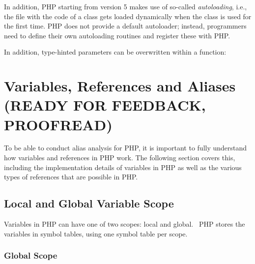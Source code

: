 In addition, PHP starting from version 5 makes use of so-called \emph{autoloading}, i.e., the file with the code of a class gets loaded dynamically when the class is used for the first time. PHP does not provide a default autoloader; instead, programmers need to define their own autoloading routines and register these with PHP.~\cite{php-manual-autoloading}


In addition, type-hinted parameters can be overwritten within a function:




\section{Variables, References and Aliases (READY FOR FEEDBACK, PROOFREAD)}

To be able to conduct alias analysis for PHP, it is important to fully understand how variables and references in PHP work. The following section covers this, including the implementation details of variables in PHP as well as the various types of references that are possible in PHP.


\subsection{Local and Global Variable Scope}
\label{sec:variable-scope}

Variables in PHP can have one of two scopes: local and global.~\cite{php-manual-scope} PHP stores the variables in symbol tables, using one symbol table per scope.~\cite{php-manual-reference-counting}

\subsubsection{Global Scope}

